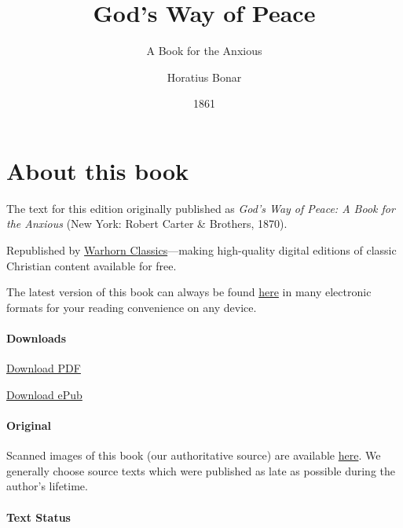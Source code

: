 \documentclass[
]{book}
\title{God's Way of Peace}
\subtitle{A Book for the Anxious}
\author{Horatius Bonar}
\date{1861}
\begin{document}
\maketitle

\mainmatter
{}

{
\setcounter{tocdepth}{1}
\tableofcontents
}
\hypertarget{about-this-book}{%
\chapter*{About this book}\label{about-this-book}}

The text for this edition originally published as \emph{God's Way of Peace: A Book for the Anxious} (New York: Robert Carter \& Brothers, 1870).

Republished by \href{https://classics.warhornmedia.com/}{Warhorn Classics}---making high-quality digital editions of classic Christian content available for free.

The latest version of this book can always be found \href{https://warhornmedia.github.io/bonar-peace/}{here} in many electronic formats for your reading convenience on any device.

\hypertarget{downloads}{%
\subsubsection*{Downloads}\label{downloads}}

\href{https://warhornmedia.github.io/bonar-peace//Bonar-Peace.pdf}{Download PDF}

\href{https://warhornmedia.github.io/bonar-peace//Bonar-Peace.epub}{Download ePub}

\hypertarget{original}{%
\subsubsection*{Original}\label{original}}

Scanned images of this book (our authoritative source) are available \href{https://archive.org/details/godswayofpeacebo00bona/page/n5/mode/2up}{here}. We generally choose source texts which were published as late as possible during the author's lifetime.

\hypertarget{text-status}{%
\subsubsection*{Text Status}\label{text-status}}
\end{document}
